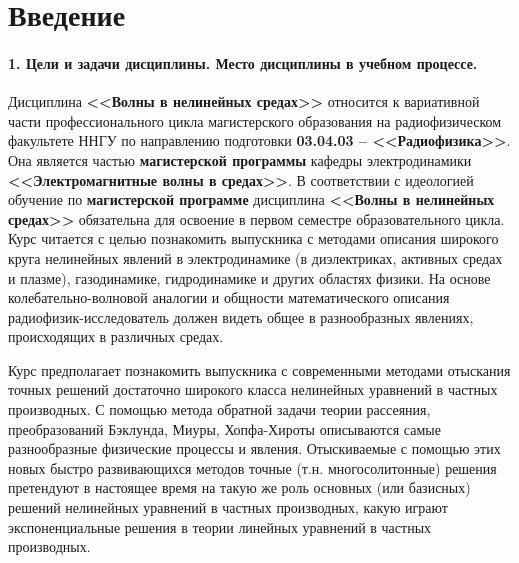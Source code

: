 \documentclass[a4paper]{article}
\begin{document}
\fontsize{14}{21pt}\selectfont
\section*{Введение}
\paragraph{\Large{1. Цели и задачи дисциплины. Место дисциплины в учебном процессе.}}

 Дисциплина \textbf{<<Волны в нелинейных средах>>} относится к вариативной части профессионального цикла магистерского образования на радиофизическом факультете ННГУ по направлению подготовки \textbf{03.04.03 -- <<Радиофизика>>}. Она является частью \textbf{магистерской программы} кафедры электродинамики \textbf{<<Электромагнитные волны в средах>>}. В соответствии с идеологией обучение по \textbf{магистерской программе} дисциплина \textbf{<<Волны в нелинейных средах>>} обязательна для освоение в первом семестре образовательного цикла. Курс читается с целью познакомить выпускника с методами описания широкого круга нелинейных явлений в электродинамике (в диэлектриках, активных средах и плазме), газодинамике, гидродинамике и других областях физики. На основе колебательно-волновой аналогии и общности математического описания радиофизик-исследователь должен видеть общее в разнообразных явлениях, происходящих в различных средах.
 
 Курс предполагает познакомить выпускника с современными методами отыскания точных решений достаточно широкого класса нелинейных уравнений в частных производных. С помощью метода обратной задачи теории рассеяния, преобразований Бэклунда, Миуры, Хопфа-Хироты описываются самые разнообразные физические процессы и явления. Отыскиваемые с помощью этих новых быстро развивающихся методов  точные (т.н. многосолитонные) решения претендуют в настоящее время на такую же роль основных (или базисных) решений нелинейных уравнений в частных производных, какую играют экспоненциальные решения в теории линейных уравнений в частных производных.
	
\end{document}
